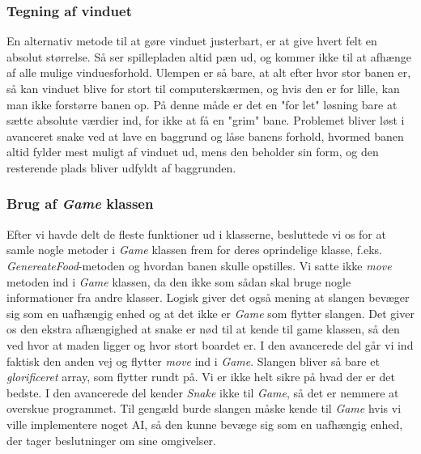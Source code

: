 \subsubsection{Tegning af vinduet}
En alternativ metode til at gøre vinduet justerbart, er at give hvert felt en absolut størrelse. 
Så ser spillepladen altid pæn ud, og kommer ikke til at afhænge af alle mulige vinduesforhold. Ulempen er så bare, at alt efter hvor stor banen er, så kan vinduet blive for stort til computerskærmen, og hvis den er for lille, kan man ikke forstørre banen op. På denne måde er det en "for let" løsning bare at sætte absolute værdier ind, for ikke at få en "grim" bane.
Problemet bliver løst i avanceret snake ved at lave en baggrund og låse banens forhold, hvormed banen altid fylder mest muligt af vinduet ud, mens den beholder sin form, og den resterende plads bliver udfyldt af baggrunden. 

\subsubsection{Brug af \textit{Game} klassen}
Efter vi havde delt de fleste funktioner ud i klasserne, besluttede vi os for at samle nogle metoder i \textit{Game} klassen frem for deres oprindelige klasse, f.eks. \textit{GenereateFood}-metoden og hvordan banen skulle opstilles. Vi satte ikke \textit{move} metoden ind i \textit{Game} klassen, da den ikke som sådan skal bruge nogle informationer fra andre klasser. Logisk giver det også mening at slangen bevæger sig som en uafhængig enhed og at det ikke er \textit{Game} som flytter slangen. Det giver os den ekstra afhængighed at snake er nød til at kende til game klassen, så den ved hvor at maden ligger og hvor stort boardet er. I den avancerede del går vi ind faktisk den anden vej og flytter \textit{move} ind i \textit{Game}. Slangen bliver så bare et \emph{glorificeret} array, som  flytter rundt på. Vi er ikke helt sikre på hvad der er det bedste. I den avancerede del kender \textit{Snake} ikke til \textit{Game}, så det er nemmere at overskue programmet. Til gengæld burde slangen måske kende til \textit{Game} hvis vi ville implementere noget AI, så den kunne bevæge sig som en uafhængig enhed, der tager beslutninger om sine omgivelser. 
